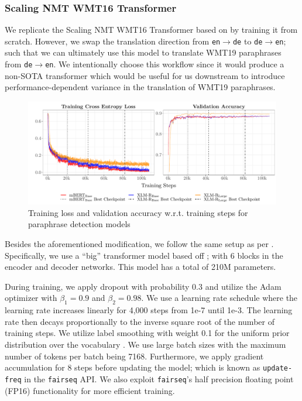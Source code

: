 \documentclass[11pt,a4paper]{article}
\begin{document}
\subsubsection{Scaling NMT WMT16 Transformer}

We replicate the Scaling NMT WMT16 Transformer based on \citet{ott2018scaling} by training it from scratch. However, we swap the translation direction from \texttt{en$\rightarrow$de} to \texttt{de$\rightarrow$en}; such that we can ultimately use this model to translate WMT19 paraphrases from \texttt{de$\rightarrow$en}. We intentionally choose this workflow since it would produce a non-SOTA transformer which would be useful for us downstream to introduce performance-dependent variance in the translation of WMT19 paraphrases.

\begin{figure}
  \centering 
  \includegraphics[trim={0.7cm 0cm 0cm 0cm},clip,width=\textwidth]{paraphrase_detection_models_evolution.pdf}
  \caption{Training loss and validation accuracy w.r.t. training steps for paraphrase detection models}
  \label{paraphrase_detection_model_evolution}
\end{figure}

Besides the aforementioned modification, we follow the same setup as per \citet{ott2018scaling}. Specifically, we use a ``big'' transformer model based off \citet{vaswani2017attention}; with 6 blocks in the encoder and decoder networks. This model has a total of 210M parameters.

During training, we apply dropout \cite{srivastava2014dropout} with probability 0.3 and utilize the Adam optimizer \cite{kingma2014adam} with $\beta_1 = 0.9$ and $\beta_2=0.98$. We use a learning rate schedule where the learning rate increases linearly for 4,000 steps from 1e-7 until 1e-3. The learning rate then decays proportionally to the inverse square root of the number of training steps. We utilize label smoothing with weight 0.1 for the uniform prior distribution over the vocabulary \cite{pereyra2017regularizing}. We use large batch sizes with the maximum number of tokens per batch being 7168. Furthermore, we apply gradient accumulation for 8 steps before updating the model; which is known as \texttt{update-freq} in the \texttt{fairseq} API. We also exploit \texttt{fairseq}'s half precision floating point (FP16) functionality for more efficient training.
\end{document}
